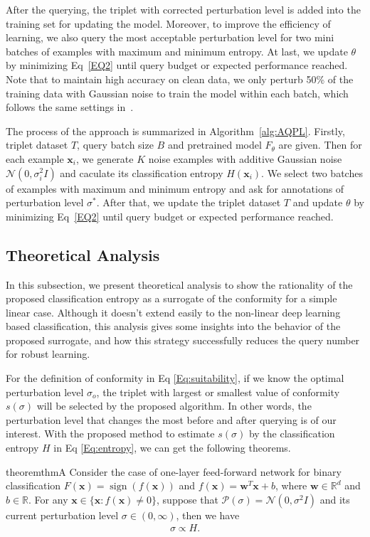 \documentclass[letterpaper]{article} %
\begin{document}
After the querying, the triplet with corrected perturbation level is added into the training set for updating the model.
Moreover, to improve the efficiency of learning, we also query the most acceptable perturbation level for two mini batches of examples with maximum and minimum entropy.
At last, we update $\theta$ by minimizing Eq~\ref{EQ2} until query budget or expected performance reached.
Note that to maintain high accuracy on clean data, we only perturb 50\% of the training data with Gaussian noise to train the model within each batch, which follows the same settings in~\cite{rusak2020increasing}.

The process of the approach is summarized in Algorithm~\ref{alg:AQPL}. Firstly, triplet dataset $T$, query batch size $B$ and pretrained model $F_\theta$ are given. Then for each example $\mathbf{x}_i$, we generate $K$ noise examples with additive Gaussian noise $\mathcal{N}(0,\sigma_i^2 I)$ and caculate its classification entropy $H(\mathbf{x}_i)$.
We select two batches of examples with maximum and minimum entropy and ask for annotations of perturbation level $\sigma^*$. After that, we update the triplet dataset $T$ and update $\theta$ by minimizing Eq~\ref{EQ2} until query budget or expected performance reached.

\subsection{Theoretical Analysis}

In this subsection, we present theoretical analysis to show the rationality of the proposed classification entropy as a surrogate of the conformity for a simple linear case. Although it doesn't extend easily to the non-linear deep learning based classification, this analysis gives some insights into the behavior of the proposed surrogate, and how this strategy successfully reduces the query number for robust learning.

For the definition of conformity in Eq \ref{Eq:suitability}, if we know the optimal perturbation level $\sigma_o$, the triplet with largest or smallest value of conformity $s(\sigma)$  will be selected by the proposed algorithm. In other words, the perturbation level that changes the most before and after querying is of our interest. With the proposed method to estimate $s(\sigma)$ by the classification entropy $H$ in Eq \ref{Eq:entropy}, we can get the following theorems.

\begin{restatable}[]{theorem}{thmA}
\label{theorem:thmA}
Consider the case of one-layer feed-forward network for binary classification $F(\mathbf{x}) = \operatorname{sign}(f(\mathbf{x}))$ and $f(\mathbf{x}) = \mathbf{w}^T \mathbf{x} + b$, where $\mathbf{w} \in \mathbb{R}^d$ and $b \in \mathbb{R}$.
For any $\mathbf{x} \in \{\mathbf{x}: f(\mathbf{x}) \neq 0\}$, suppose that $\mathcal{P}(\sigma) = \mathcal{N}(0, \sigma^{2} I)$ and its current perturbation level $\sigma \in (0, \infty)$, then we have
\begin{align}
\sigma \propto H.
\end{align}
\end{restatable}
\end{document}
